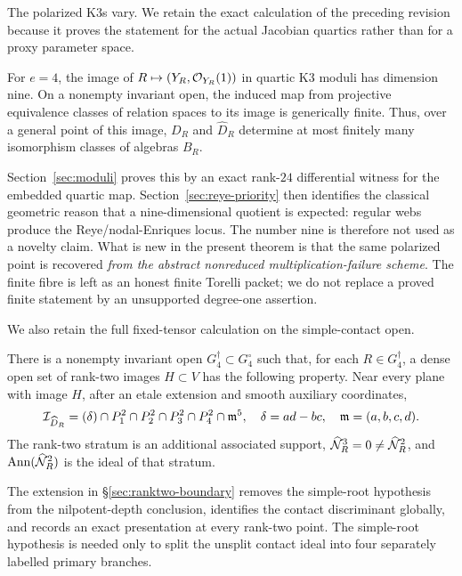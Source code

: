 The polarized K3s vary.  We retain the exact calculation of the
preceding revision because it proves the statement for the actual
Jacobian quartics rather than for a proxy parameter space.

\begin{theorem}\label{thm:main-moduli}
For $e=4$, the image of
$R\mapsto(Y_R,\mathcal O_{Y_R}(1))$ in quartic K3 moduli has dimension nine.
On a nonempty invariant open, the induced map from projective
equivalence classes of relation spaces to its image is generically
finite.  Thus, over a general point of this image, $D_R$ and
$\widehat D_R$ determine at most finitely many isomorphism classes
of algebras $B_R$.
\end{theorem}

Section~\ref{sec:moduli} proves this by an exact rank-$24$ differential
witness for the embedded quartic map.  Section~\ref{sec:reye-priority}
then identifies the classical geometric reason that a nine-dimensional
quotient is expected: regular webs produce the Reye/nodal-Enriques
locus.  The number nine is therefore not used as a novelty claim.
What is new in the present theorem is that the same polarized point is
recovered \emph{from the abstract nonreduced multiplication-failure
scheme}.  The finite fibre is left as an honest finite Torelli packet;
we do not replace a proved finite statement by an unsupported
degree-one assertion.

We also retain the full fixed-tensor calculation on the simple-contact
open.

\begin{theorem}\label{thm:main-coranktwo}
There is a nonempty invariant open $G_4^\dagger\subset G_4^\circ$
such that, for each $R\in G_4^\dagger$, a dense open set of
rank-two images $H\subset V$ has the following property.  Near every
plane with image $H$, after an etale extension and smooth auxiliary
coordinates,
\begin{equation}\label{eq:main-coranktwo}
 \mathcal I_{\widehat D_R}
 =(\delta)\cap P_1^2\cap P_2^2\cap P_3^2\cap P_4^2\cap\mathfrak m^5,
 \quad
 \delta=ad-bc,\quad\mathfrak m=(a,b,c,d).
\end{equation}
The rank-two stratum is an additional associated support,
$\widehat{\mathcal N}_R^3=0\ne\widehat{\mathcal N}_R^2$, and
$\operatorname{Ann}(\widehat{\mathcal N}_R^2)$ is the ideal of that stratum.
\end{theorem}

The extension in \S\ref{sec:ranktwo-boundary} removes the simple-root
hypothesis from the nilpotent-depth conclusion, identifies the contact
discriminant globally, and records an exact presentation at every
rank-two point.  The simple-root hypothesis is needed only to split
the unsplit contact ideal into four separately labelled primary
branches.

